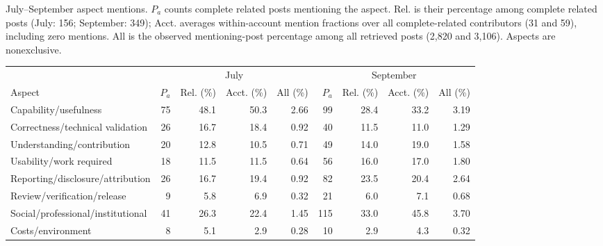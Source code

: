 \caption{July--September aspect mentions. $P_a$ counts complete related posts mentioning the aspect. Rel. is their percentage among complete related posts (July: 156; September: 349); Acct. averages within-account mention fractions over all complete-related contributors (31 and 59), including zero mentions. All is the observed mentioning-post percentage among all retrieved posts (2,820 and 3,106). Aspects are nonexclusive.}
\label{tab:july_september}
\centering
\begin{tabular}{lrrrrrrrr}
\toprule
& \multicolumn{4}{c}{July} & \multicolumn{4}{c}{September}\\
\cmidrule(lr){2-5}\cmidrule(lr){6-9}
Aspect & $P_a$ & Rel. (\%) & Acct. (\%) & All (\%) & $P_a$ & Rel. (\%) & Acct. (\%) & All (\%)\\
\midrule
Capability/usefulness & 75 & 48.1 & 50.3 & 2.66 & 99 & 28.4 & 33.2 & 3.19\\
Correctness/technical validation & 26 & 16.7 & 18.4 & 0.92 & 40 & 11.5 & 11.0 & 1.29\\
Understanding/contribution & 20 & 12.8 & 10.5 & 0.71 & 49 & 14.0 & 19.0 & 1.58\\
Usability/work required & 18 & 11.5 & 11.5 & 0.64 & 56 & 16.0 & 17.0 & 1.80\\
Reporting/disclosure/attribution & 26 & 16.7 & 19.4 & 0.92 & 82 & 23.5 & 20.4 & 2.64\\
Review/verification/release & 9 & 5.8 & 6.9 & 0.32 & 21 & 6.0 & 7.1 & 0.68\\
Social/professional/institutional & 41 & 26.3 & 22.4 & 1.45 & 115 & 33.0 & 45.8 & 3.70\\
Costs/environment & 8 & 5.1 & 2.9 & 0.28 & 10 & 2.9 & 4.3 & 0.32\\
\bottomrule
\end{tabular}
